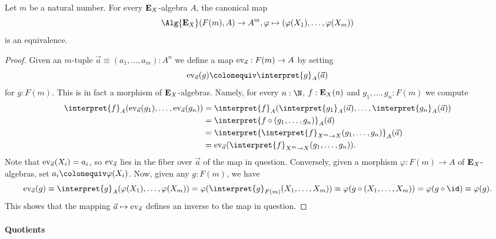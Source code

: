 {\begin{lemma}
  Let \(m\) be a natural number.
  For every \(\mathbf{E}_X\)-algebra \(A\), the canonical map
  \[
    \Alg{\EE_X}(F(m),A) \to A^m, \varphi \mapsto (\varphi(X_1),\dots,\varphi(X_m))
  \]
  is an equivalence.
\end{lemma}
\begin{proof}
  Given an \(m\)-tuple \(\vec a\equiv (a_1,\dots,a_m) : A^n\) we define a map \(\operatorname{\mathrm{ev}}_{\vec a} : F(m)\to A\) by setting
  \[\ev_{\vec a}(g) \colonequiv \interpret{g}_A(\vec a)\]
  for \(g:F(m)\).
  This is in fact a morphism of \(\mathbf{E}_X\)-algebras.
  Namely, for every \(n:\N\), \(f:\mathbf{E}_X(n)\) and \(g_1,\dots,g_n : F(m)\) we compute
  \begin{align*}
    \interpret{f}_A(\ev_{\vec a}(g_1),\dots,\ev_{\vec a}(g_n)) & = \interpret{f}_A(\interpret{g_1}_A(\vec a),\dots,\interpret{g_n}_A(\vec a)) \\
    & = \interpret{f\circ(g_1,\dots,g_n)}_A (\vec a)\\
    & = \interpret{\interpret{f}_{X^m\to X}(g_1,\dots,g_n)}_A (\vec a)\\
    & = \ev_{\vec a}(\interpret{f}_{X^m \to X}(g_1,\dots,g_n)).
  \end{align*}
  Note that \(\operatorname{\mathrm{ev}}_{\vec a}(X_i) = a_i\), so \(\operatorname{\mathrm{ev}}_{\vec a}\) lies in the fiber over \(\vec a\) of the map in question.
  Conversely, given a morphism \(\varphi : F(m)\to A\) of \(\mathbf{E}_X\)-algebras, set \(a_i\colonequiv \varphi(X_i)\).
  Now, given any \(g:F(m)\), we have
  \begin{equation*}
    \ev_{\vec a}(g)
    \equiv \interpret{g}_A(\varphi(X_1),\dots,\varphi(X_m))
     = \varphi(\interpret{g}_{F(m)}(X_1,\dots,X_m))
     \equiv \varphi(g\circ (X_1,\dots,X_m))
     = \varphi(g\circ\id) \equiv \varphi(g).
  \end{equation*}
  This shows that the mapping \(\vec a \mapsto \operatorname{\mathrm{ev}}_{\vec a}\) defines an inverse to the map in question.
\end{proof}

\paragraph{Quotients}

}
